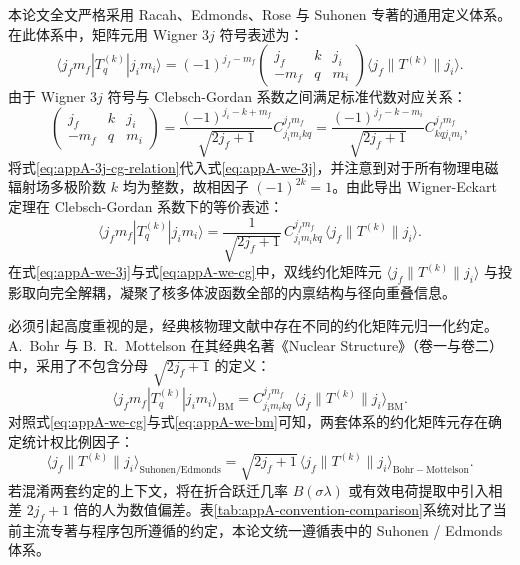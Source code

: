 本论文全文严格采用 Racah、Edmonds、Rose 与 Suhonen 专著的通用定义体系。在此体系中，矩阵元用 Wigner $3j$ 符号表述为：
\begin{equation}\label{eq:appA-we-3j}
\langle j_f m_f | T_q^{(k)} | j_i m_i \rangle = (-1)^{j_f - m_f} \begin{pmatrix} j_f & k & j_i \\ -m_f & q & m_i \end{pmatrix} \langle j_f \| T^{(k)} \| j_i \rangle .
\end{equation}
由于 Wigner $3j$ 符号与 Clebsch-Gordan 系数之间满足标准代数对应关系：
\begin{equation}\label{eq:appA-3j-cg-relation}
\begin{pmatrix} j_f & k & j_i \\ -m_f & q & m_i \end{pmatrix} = \frac{(-1)^{j_i - k + m_f}}{\sqrt{2j_f + 1}} C_{j_i m_i k q}^{j_f m_f} = \frac{(-1)^{j_f - k - m_i}}{\sqrt{2j_f + 1}} C_{k q j_i m_i}^{j_f m_f} ,
\end{equation}
将式\eqref{eq:appA-3j-cg-relation}代入式\eqref{eq:appA-we-3j}，并注意到对于所有物理电磁辐射场多极阶数 $k$ 均为整数，故相因子 $(-1)^{2k} = 1$。由此导出 Wigner-Eckart 定理在 Clebsch-Gordan 系数下的等价表述：
\begin{equation}\label{eq:appA-we-cg}
\langle j_f m_f | T_q^{(k)} | j_i m_i \rangle = \frac{1}{\sqrt{2j_f + 1}} \, C_{j_i m_i k q}^{j_f m_f} \, \langle j_f \| T^{(k)} \| j_i \rangle .
\end{equation}
在式\eqref{eq:appA-we-3j}与式\eqref{eq:appA-we-cg}中，双线约化矩阵元 $\langle j_f \| T^{(k)} \| j_i \rangle$ 与投影取向完全解耦，凝聚了核多体波函数全部的内禀结构与径向重叠信息。

必须引起高度重视的是，经典核物理文献中存在不同的约化矩阵元归一化约定。A.~Bohr 与 B.~R.~Mottelson 在其经典名著《Nuclear Structure》（卷一与卷二）中，采用了不包含分母 $\sqrt{2j_f + 1}$ 的定义：
\begin{equation}\label{eq:appA-we-bm}
\langle j_f m_f | T_q^{(k)} | j_i m_i \rangle_{\mathrm{BM}} = C_{j_i m_i k q}^{j_f m_f} \, \langle j_f \| T^{(k)} \| j_i \rangle_{\mathrm{BM}} .
\end{equation}
对照式\eqref{eq:appA-we-cg}与式\eqref{eq:appA-we-bm}可知，两套体系的约化矩阵元存在确定统计权比例因子：
\begin{equation}\label{eq:appA-rme-trans-factor}
\langle j_f \| T^{(k)} \| j_i \rangle_{\mathrm{Suhonen/Edmonds}} = \sqrt{2j_f + 1} \, \langle j_f \| T^{(k)} \| j_i \rangle_{\mathrm{Bohr-Mottelson}} .
\end{equation}
若混淆两套约定的上下文，将在折合跃迁几率 $B(\sigma\lambda)$ 或有效电荷提取中引入相差 $2j_f + 1$ 倍的人为数值偏差。表\ref{tab:appA-convention-comparison}系统对比了当前主流专著与程序包所遵循的约定，本论文统一遵循表中的 Suhonen / Edmonds 体系。

